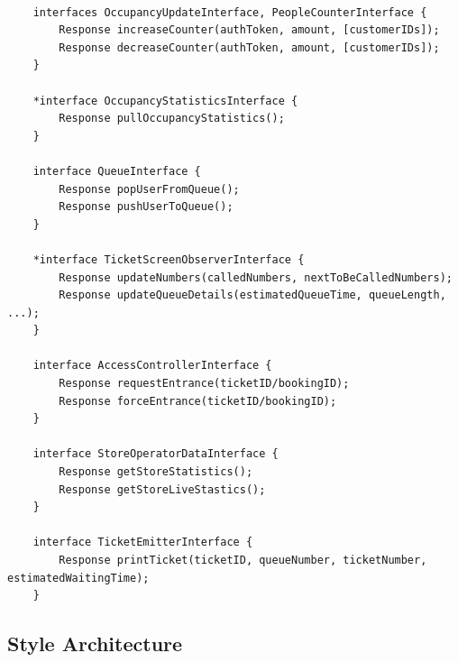 \begin{lstlisting}

    interfaces OccupancyUpdateInterface, PeopleCounterInterface {
        Response increaseCounter(authToken, amount, [customerIDs]);
        Response decreaseCounter(authToken, amount, [customerIDs]);
    }

    *interface OccupancyStatisticsInterface {
        Response pullOccupancyStatistics();
    }

    interface QueueInterface {
        Response popUserFromQueue();
        Response pushUserToQueue();
    }

    *interface TicketScreenObserverInterface {
        Response updateNumbers(calledNumbers, nextToBeCalledNumbers);
        Response updateQueueDetails(estimatedQueueTime, queueLength, ...);
    }

    interface AccessControllerInterface {
        Response requestEntrance(ticketID/bookingID);
        Response forceEntrance(ticketID/bookingID);
    }

    interface StoreOperatorDataInterface {
        Response getStoreStatistics();
        Response getStoreLiveStastics();
    }

    interface TicketEmitterInterface {
        Response printTicket(ticketID, queueNumber, ticketNumber, estimatedWaitingTime);
    }

\end{lstlisting}

\subsection{Style Architecture}

